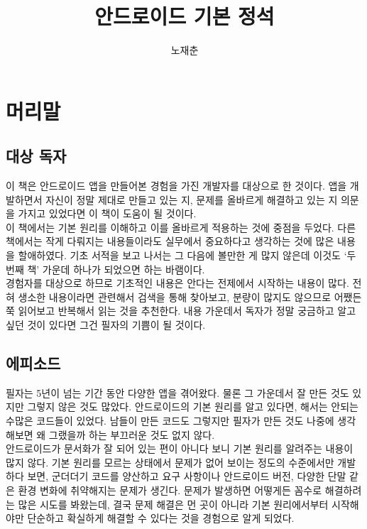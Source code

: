 \documentclass[a4paper,hidelinks,10pt,openany]{book} %
\title{안드로이드 기본 정석}
\author{노재춘}
\begin{document}

\maketitle
\chapter*{머리말}
\section{대상 독자}
이 책은 안드로이드 앱을 만들어본 경험을 가진 개발자를 대상으로 한 것이다. 
앱을 개발하면서 자신이 정말 제대로 만들고 있는 지, 문제를 올바르게 해결하고 있는 지 의문을 가지고 있었다면 이 책이 도움이 될 것이다.\\

이 책에서는 기본 원리를 이해하고 이를 올바르게 적용하는 것에 중점을 두었다. 
다른 책에서는 작게 다뤄지는 내용들이라도 실무에서 중요하다고 생각하는 것에 많은 내용을 할애하였다.
기초 서적을 보고 나서는 그 다음에 볼만한 게 많지 않은데 이것도 `두 번째 책' 가운데 하나가 되었으면 하는 바램이다.\\

경험자를 대상으로 하므로 기초적인 내용은 안다는 전제에서 시작하는 내용이 많다. 
전혀 생소한 내용이라면 관련해서 검색을 통해 찾아보고, 분량이 많지도 않으므로 어쨌든 쭉 읽어보고 반복해서 읽는 것을 추천한다. 
내용 가운데서 독자가 정말 궁금하고 알고 싶던 것이 있다면 그건 필자의 기쁨이 될 것이다.

\section{에피소드}
필자는 5년이 넘는 기간 동안 다양한 앱을 겪어왔다. 물론 그 가운데서 잘 만든 것도 있지만 그렇지 않은 것도 많았다. 
안드로이드의 기본 원리를 알고 있다면, 해서는 안되는 수많은 코드들이 있었다.
남들이 만든 코드도 그렇지만 필자가 만든 것도 나중에 생각해보면 왜 그랬을까 하는 부끄러운 것도 없지 않다.\\

안드로이드가 문서화가 잘 되어 있는 편이 아니다 보니 기본 원리를 알려주는 내용이 많지 않다. 
기본 원리를 모르는 상태에서 문제가 없어 보이는 정도의 수준에서만 개발하다 보면, 군더더기 코드를 양산하고 요구 사항이나 안드로이드 버전, 다양한 단말 같은 환경 변화에 취약해지는 문제가 생긴다.
문제가 발생하면 어떻게든 꼼수로 해결하려는 많은 시도를 봐왔는데, 결국 문제 해결은 먼 곳이 아니라 기본 원리에서부터 시작해야만
단순하고 확실하게 해결할 수 있다는 것을 경험으로 알게 되었다.\\
\end{document}
